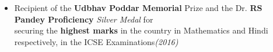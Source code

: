 \documentclass{article}
\newcommand{\xfilll}[2][1ex]{
\dimen0=#2\advance\dimen0 by #1
\leaders\hrule height \dimen0 depth -#1\hfill}
\begin{document}
\begin{itemize}[itemsep = -1.2 mm, leftmargin=*]
\item  Recipient of the {\bf Udbhav Poddar Memorial} Prize and the Dr. {\bf RS Pandey Proficiency} {\it Silver Medal} for\vspace{-0.2mm} \\securing the \textbf{highest marks} in the country in Mathematics and Hindi respectively, in the ICSE Examinations\hfill{\sl \small (2016)}
\end{itemize}


\vspace{-20pt}
\end{document}
